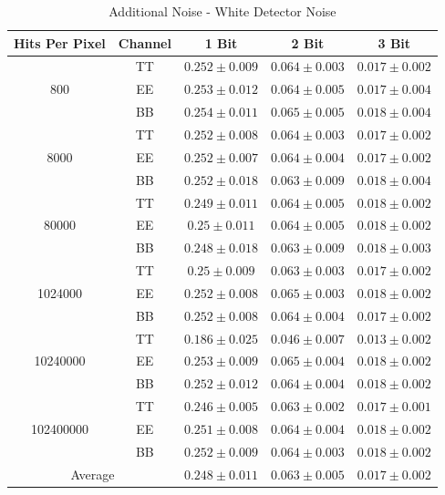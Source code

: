 \documentclass[apj]{emulateapj}
\begin{document}
\def\arraystretch{1.3}
\begin{table}[tbh]
\begin{center}
\caption{\label{tab:extranoisewhite} Additional Noise - White Detector Noise}
\small
\begin{tabular}{c c c c c}
Hits Per Pixel & Channel & 1 Bit & 2 Bit & 3 Bit \\
\hline
\hline
\multirow{3}{*}{800}  & TT  & $ 0.252 \pm 0.009 $  & $ 0.064 \pm 0.003 $  & $ 0.017 \pm 0.002 $ \\
& EE  & $ 0.253 \pm 0.012 $  & $ 0.064 \pm 0.005 $  & $ 0.017 \pm 0.004 $ \\
& BB  & $ 0.254 \pm 0.011 $  & $ 0.065 \pm 0.005 $  & $ 0.018 \pm 0.004 $ \\
\hline
\multirow{3}{*}{8000}  & TT  & $ 0.252 \pm 0.008 $  & $ 0.064 \pm 0.003 $  & $ 0.017 \pm 0.002 $ \\
& EE  & $ 0.252 \pm 0.007 $  & $ 0.064 \pm 0.004 $  & $ 0.017 \pm 0.002 $ \\
& BB  & $ 0.252 \pm 0.018 $  & $ 0.063 \pm 0.009 $  & $ 0.018 \pm 0.004 $ \\
\hline
\multirow{3}{*}{80000}  & TT  & $ 0.249 \pm 0.011 $  & $ 0.064 \pm 0.005 $  & $ 0.018 \pm 0.002 $ \\
& EE  & $ 0.25 \pm 0.011 $  & $ 0.064 \pm 0.005 $  & $ 0.018 \pm 0.002 $ \\
& BB  & $ 0.248 \pm 0.018 $  & $ 0.063 \pm 0.009 $  & $ 0.018 \pm 0.003 $ \\
\hline
\multirow{3}{*}{1024000}  & TT  & $ 0.25 \pm 0.009 $  & $ 0.063 \pm 0.003 $  & $ 0.017 \pm 0.002 $ \\
& EE  & $ 0.252 \pm 0.008 $  & $ 0.065 \pm 0.003 $  & $ 0.018 \pm 0.002 $ \\
& BB  & $ 0.252 \pm 0.008 $  & $ 0.064 \pm 0.004 $  & $ 0.017 \pm 0.002 $ \\
\hline
\multirow{3}{*}{10240000}  & TT  & $ 0.186 \pm 0.025 $  & $ 0.046 \pm 0.007 $  & $ 0.013 \pm 0.002 $ \\
& EE  & $ 0.253 \pm 0.009 $  & $ 0.065 \pm 0.004 $  & $ 0.018 \pm 0.002 $ \\
& BB  & $ 0.252 \pm 0.012 $  & $ 0.064 \pm 0.004 $  & $ 0.018 \pm 0.002 $ \\
\hline
\multirow{3}{*}{102400000}  & TT  & $ 0.246 \pm 0.005 $  & $ 0.063 \pm 0.002 $  & $ 0.017 \pm 0.001 $ \\
& EE  & $ 0.251 \pm 0.008 $  & $ 0.064 \pm 0.004 $  & $ 0.018 \pm 0.002 $ \\
& BB  & $ 0.252 \pm 0.009 $  & $ 0.064 \pm 0.003 $  & $ 0.018 \pm 0.002 $ \\
\hline
\multicolumn{2}{c}{Average}  & $ 0.248 \pm 0.011 $  & $ 0.063 \pm 0.005 $  & $ 0.017 \pm 0.002 $ \\
\end{tabular}
 \normalsize
\end{center}
\end{table}
\end{document}
